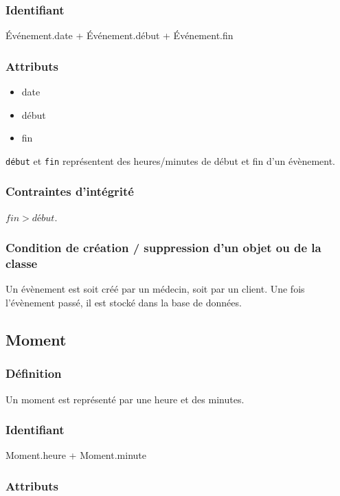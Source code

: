 \subsubsection{Identifiant}

Événement.date + Événement.début + Événement.fin

\subsubsection{Attributs}

\begin{itemize}
    \item date
    \item début
    \item fin
\end{itemize}

\texttt{début} et \texttt{fin} représentent des heures/minutes de début et fin d'un évènement.

\subsubsection{Contraintes d'intégrité}

$fin > début$.

\subsubsection{Condition de création / suppression d'un objet ou de la classe}

Un évènement est soit créé par un médecin, soit par un client. Une fois l'évènement passé,
il est stocké dans la base de données.

\subsection{Moment}

\subsubsection{Définition}

Un moment est représenté par une heure et des minutes.

\subsubsection{Identifiant}

Moment.heure + Moment.minute

\subsubsection{Attributs}

